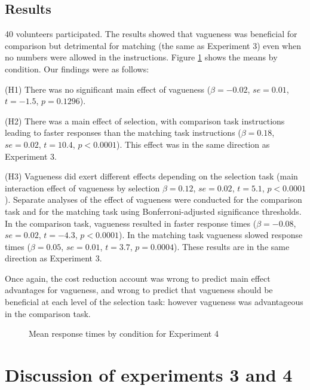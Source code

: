 \documentclass[%
man,		%
floatsintext,%
apacite%
]{apa6} %
\begin{document}
\subsection{Results}%
40 volunteers participated.
The results showed that vagueness was beneficial for comparison but detrimental for matching (the same as Experiment 3) even when no numbers were allowed in the instructions. 
Figure \ref{resultse4} shows the means by condition. Our findings were as follows:

{\small
\begin{APAenumerate}
	\item [(H1)] There was no significant main effect of vagueness ($\beta=-0.02$, $se=0.01$, $t=-1.5$, $p=0.1296$). 
	\item [(H2)] There was a main effect of selection, with comparison task instructions leading to faster responses than the matching task instructions ($\beta=0.18$, $se=0.02$, $t=10.4$, $p<0.0001$).  This effect was in the same direction as Experiment 3. 
	\item[(H3)] Vagueness did exert different effects depending on the selection task (main interaction effect of vagueness by selection $\beta=0.12$, $se=0.02$, $t=5.1$, $p<0.0001$). 
Separate analyses of the effect of vagueness were conducted for the comparison task and for the matching task using Bonferroni-adjusted significance thresholds. 
In the comparison task, vagueness resulted in faster response times ($\beta=-0.08$, $se=0.02$, $t=-4.3$, $p<0.0001$). 
In the matching task vagueness slowed response times ($\beta=0.05$, $se=0.01$, $t=3.7$, $p=0.0004$). 
These results are in the same direction as Experiment 3.
\end{APAenumerate}
}

Once again, the cost reduction account was wrong to predict main effect advantages for vagueness, and wrong to predict that vagueness should be beneficial at each level of the selection task: however vagueness was advantageous in the comparison task.

\begin{figure}[htbp]
\centering
{}
\caption{Mean response times by condition for Experiment 4}
\label{resultse4}
\end{figure}

\section{Discussion of experiments 3 and 4}
\end{document}
